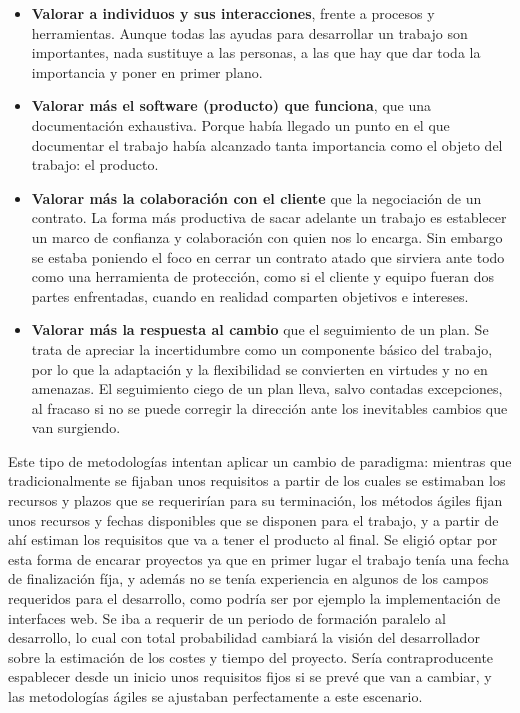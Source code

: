 \begin{itemize}
    \item \textbf{Valorar a individuos y sus interacciones}, frente a procesos y herramientas. Aunque todas las ayudas para desarrollar un trabajo son importantes, nada sustituye a las personas, a las que hay que dar toda la importancia y poner en primer plano.
    \item \textbf{Valorar más el software (producto) que funciona}, que una documentación exhaustiva. Porque había llegado un punto en el que documentar el trabajo había alcanzado tanta importancia como el objeto del trabajo: el producto.
    \item \textbf{Valorar más la colaboración con el cliente} que la negociación de un contrato. La forma más productiva de sacar adelante un trabajo es establecer un marco de confianza y colaboración con quien nos lo encarga. Sin embargo se estaba poniendo el foco en cerrar un contrato atado que sirviera ante todo como una herramienta de protección, como si el cliente y equipo fueran dos partes enfrentadas, cuando en realidad comparten objetivos e intereses.
    \item \textbf{Valorar más la respuesta al cambio} que el seguimiento de un plan. Se trata de apreciar la incertidumbre como un componente básico del trabajo, por lo que la adaptación y la flexibilidad se convierten en virtudes y no en amenazas. El seguimiento ciego de un plan lleva, salvo contadas excepciones, al fracaso si no se puede corregir la dirección ante los inevitables cambios que van surgiendo.
\end{itemize}

Este tipo de metodologías intentan aplicar un cambio de paradigma: mientras que tradicionalmente se fijaban unos requisitos a partir de los cuales se estimaban los recursos y plazos que se requerirían para su terminación, los métodos ágiles fijan unos recursos y fechas disponibles que se disponen para el trabajo, y a partir de ahí estiman los requisitos que va a tener el producto al final. Se eligió optar por esta forma de encarar proyectos ya que en primer lugar el trabajo tenía una fecha de finalización fíja, y además no se tenía experiencia en algunos de los campos requeridos para el desarrollo, como podría ser por ejemplo la implementación de interfaces web. Se iba a requerir de un periodo de formación paralelo al desarrollo, lo cual con total probabilidad cambiará la visión del desarrollador sobre la estimación de los costes y tiempo del proyecto. Sería contraproducente espablecer desde un inicio unos requisitos fijos si se prevé que van a cambiar, y  las metodologías ágiles se ajustaban perfectamente a este escenario.


